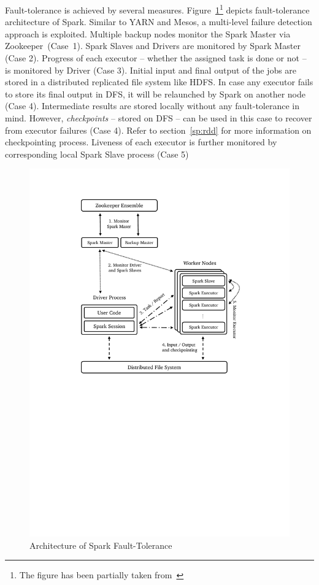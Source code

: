 \begin{description}[leftmargin=0pt]
     Fault-tolerance is achieved by several measures. Figure~\ref{fig:spark-full}\footnote{The figure has been partially taken from~\textcite{spark-guide}} depicts fault-tolerance architecture of Spark. Similar to YARN and Mesos, a multi-level failure detection approach is exploited. Multiple backup nodes monitor the Spark Master via Zookeeper~(Case~1). Spark Slaves and Drivers are monitored by Spark Master (Case 2). Progress of each executor -- whether the assigned task is done or not -- is monitored by Driver (Case 3). Initial input and final output of the jobs are stored in a distributed replicated file system like HDFS. In case any executor fails to store its final output in DFS, it will be relaunched by Spark on another node (Case 4). Intermediate results are stored locally without any fault-tolerance in mind. However, \emph{checkpoints} -- stored on DFS -- can be used in this case to recover from executor failures (Case 4). Refer to section~\ref{sp:rdd} for more information on checkpointing process. Liveness of each executor is further monitored by corresponding local Spark Slave process (Case 5)
     \begin{figure}[ht]
         \centering
         \includegraphics[clip,trim=4cm 13cm 4cm 2.2cm]{spark-full.pdf}
         \caption{Architecture of Spark Fault-Tolerance}
         \label{fig:spark-full}
     \end{figure}
\end{description}


